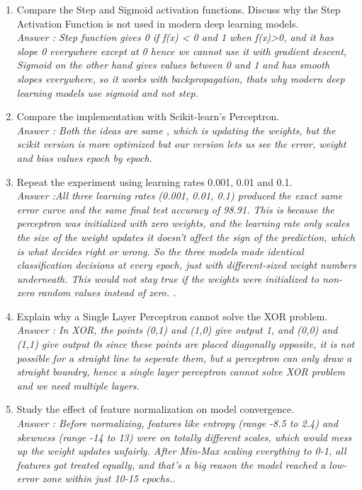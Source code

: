 \documentclass[11pt]{article}
\begin{document}
\begin{enumerate}[leftmargin=*]
\item Compare the Step and Sigmoid activation functions. Discuss why the Step Activation Function is not used in modern deep learning models.
\\
\textit{Answer : Step function gives 0 if f(x) < 0 and 1 when f(x)>0, and it has slope 0 everywhere except at 0 hence we cannot use it with gradient descent, Sigmoid on the other hand gives values between 0 and 1 and has smooth slopes everywhere, so it works with backpropagation, thats why modern deep learning models use sigmoid and not step.}
\item Compare the implementation with Scikit-learn's Perceptron.
\\
\textit{Answer : Both the ideas are same , which is updating the weights, but the scikit version is more optimized but our version lets us see the error, weight and bias values epoch by epoch.}
\item Repeat the experiment using learning rates 0.001, 0.01 and 0.1.
\\
\textit{Answer :All three learning rates (0.001, 0.01, 0.1) produced the exact same error curve and the same final test accuracy of 98.91. This is because the perceptron was initialized with zero weights, and the learning rate only scales the size of the weight updates it doesn't affect the sign of the prediction, which is what decides right or wrong. So the three models made identical classification decisions at every epoch, just with different-sized weight numbers underneath. This would not stay true if the weights were initialized to non-zero random values instead of zero. .}
\item Explain why a Single Layer Perceptron cannot solve the XOR problem.
\\
\textit{Answer : In XOR, the points (0,1) and (1,0) give output 1, and (0,0) and (1,1) give output 0s since these points are placed diagonally opposite, it is not possible for a straight line to seperate them, but a perceptron can only draw a straight boundry, hence a single layer perceptron cannot solve XOR problem and we need multiple layers.}
\item Study the effect of feature normalization on model convergence.
\\
\textit{Answer : Before normalizing, features like entropy (range -8.5 to 2.4) and skewness (range -14 to 13) were on totally different scales, which would mess up the weight updates unfairly. After Min-Max scaling everything to 0-1, all features got treated equally, and that's a big reason the model reached a low-error zone within just 10-15 epochs..}
\end{enumerate}
\end{document}
